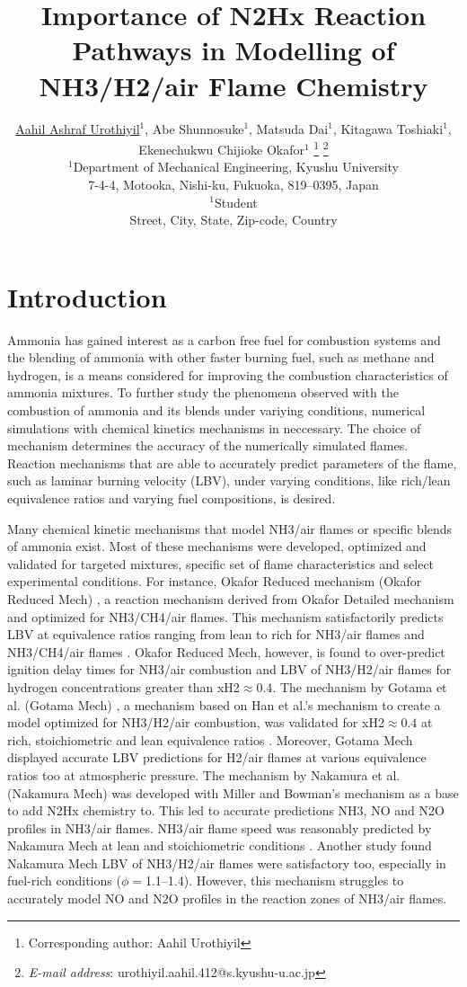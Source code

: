 \documentclass[10pt,twocolumn]{icfd2026paper}
\title{Importance of N2Hx Reaction Pathways in Modelling of NH3/H2/air Flame Chemistry}
\author{\underline{Aahil Ashraf Urothiyil}${}^1$,
	Abe Shunnosuke${}^1$, Matsuda Dai${}^1$, Kitagawa Toshiaki${}^1$, Ekenechukwu Chijioke Okafor${}^1$
	\footnote{\normalsize Corresponding author: Aahil Urothiyil}
	\footnote{\normalsize {\textit{E-mail address}}:  urothiyil.aahil.412@s.kyushu-u.ac.jp}
	\\
	${}^1$Department of Mechanical Engineering, Kyushu University \\
	7-4-4, Motooka, Nishi-ku, Fukuoka, 819--0395, Japan \\
	${}^1$Student \\ %
	Street, City, State, Zip-code, Country
}
\begin{document}
\maketitle
\thispagestyle{empty}

\section{Introduction}

Ammonia has gained interest as a carbon free fuel for combustion systems and the blending of ammonia with other
faster burning fuel, such as methane and hydrogen, is a means considered for improving the combustion characteristics of
ammonia mixtures. To further study the phenomena observed with the combustion of ammonia and its blends under variying
conditions, numerical simulations with chemical kinetics mechanisms in neccessary. The choice of mechanism determines
the accuracy of the numerically simulated flames. Reaction mechanisms that are able to accurately predict parameters of
the flame, such as laminar burning velocity (LBV), under varying conditions, like rich/lean equivalence ratios and
varying fuel compositions, is desired.

Many chemical kinetic mechanisms that model NH3/air flames or specific blends of ammonia exist. Most of these
mechanisms were developed, optimized and validated for targeted mixtures, specific set of flame characteristics and
select experimental conditions. For instance, Okafor Reduced mechanism (Okafor Reduced Mech)
\cite{okaforMeasurement2019}, a reaction mechanism derived from Okafor Detailed mechanism \cite{okaforExperimental2018}
and optimized for NH3/CH4/air flames. This mechanism satisfactorily predicts LBV at equivalence ratios ranging from lean
to rich for NH3/air flames \cite{okaforMeasurement2019, meiExperimental2019} and NH3/CH4/air flames
\cite{okaforMeasurement2019, chaiReview2021}. Okafor Reduced Mech, however, is found to over-predict ignition delay
times for NH3/air combustion \cite{liChemical2019} and LBV of NH3/H2/air flames for hydrogen concentrations greater than
xH2$\approx0.4$. The mechanism by Gotama et al. (Gotama Mech) \cite{gotamaMeasurement2022}, a mechanism based on Han et
al.'s mechanism \cite{hanExperimental2020} to create a model optimized for NH3/H2/air combustion, was validated for
xH2$\approx0.4$ at rich, stoichiometric and lean equivalence ratios \cite{gotamaMeasurement2022}. Moreover, Gotama Mech
displayed accurate LBV predictions for H2/air flames at various equivalence ratios too at atmospheric pressure. The
mechanism by Nakamura et al. (Nakamura Mech) \cite{nakamuraKinetic2017} was developed with Miller and Bowman's mechanism
\cite{millerMechanism1989} as a base to add N2Hx chemistry to. This led to accurate predictions NH3, NO and N2O profiles
in NH3/air flames. NH3/air flame speed was reasonably predicted by Nakamura Mech at lean and stoichiometric conditions
\cite{meiExperimental2019}. Another study found Nakamura Mech LBV of NH3/H2/air flames were satisfactory too, especially
in fuel-rich conditions ($\phi=$1.1--1.4). However, this mechanism struggles to accurately model NO and N2O profiles in
the reaction zones of NH3/air flames.
\end{document}
